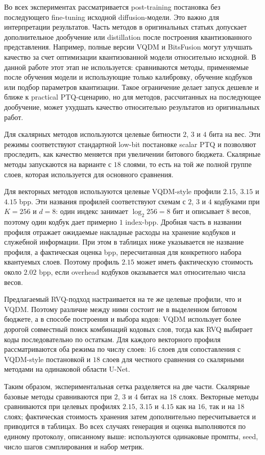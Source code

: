 \documentclass[a4paper,12pt]{article}
\begin{document}
Во всех экспериментах рассматривается post-training постановка без последующего fine-tuning исходной diffusion-модели. Это важно для интерпретации результатов. Часть методов в оригинальных статьях допускает дополнительное дообучение или distillation после построения квантизованного представления. Например, полные версии VQDM и BitsFusion могут улучшать качество за счет оптимизации квантизованной модели относительно исходной. В данной работе этот этап не используется: сравниваются методы, применяемые после обучения модели и использующие только калибровку, обучение кодбуков или подбор параметров квантизации. Такое ограничение делает запуск дешевле и ближе к practical PTQ-сценарию, но для методов, рассчитанных на последующее дообучение, может ухудшать качество относительно результатов из оригинальных работ.

Для скалярных методов используются целевые битности $2$, $3$ и $4$ бита на вес. Эти режимы соответствуют стандартной low-bit постановке scalar PTQ и позволяют проследить, как качество меняется при увеличении битового бюджета. Скалярные методы запускаются на варианте с $18$ слоями, то есть на той же полной группе слоев, которая используется для основного сравнения.

Для векторных методов используются целевые VQDM-style профили $2.15$, $3.15$ и $4.15$ bpp. Эти названия профилей соответствуют схемам с $2$, $3$ и $4$ кодбуками при $K=256$ и $d=8$: один индекс занимает $\log_2 256 = 8$ бит и описывает $8$ весов, поэтому один кодбук дает примерно $1$ index-bpp. Дробная часть в названии профиля отражает ожидаемые накладные расходы на хранение кодбуков и служебной информации. При этом в таблицах ниже указывается не название профиля, а фактическая оценка bpp, пересчитанная для конкретного набора квантуемых слоев. Поэтому профиль $2.15$ может иметь фактическую стоимость около $2.02$ bpp, если overhead кодбуков оказывается мал относительно числа весов.

Предлагаемый RVQ-подход настраивается на те же целевые профили, что и VQDM. Поэтому различие между ними состоит не в выделенном битовом бюджете, а в способе построения и выбора кодов: VQDM использует более дорогой совместный поиск комбинаций кодовых слов, тогда как RVQ выбирает коды последовательно по остаткам. Для каждого векторного профиля рассматриваются оба режима по числу слоев: $16$ слоев для сопоставления с VQDM-style постановкой и $18$ слоев для честного сравнения со скалярными методами на одинаковой области U-Net.

Таким образом, экспериментальная сетка разделяется на две части. Скалярные базовые методы сравниваются при $2$, $3$ и $4$ битах на $18$ слоях. Векторные методы сравниваются при целевых профилях $2.15$, $3.15$ и $4.15$ как на $16$, так и на $18$ слоях; фактическая стоимость хранения затем дополнительно пересчитывается и приводится в таблицах. Во всех случаях генерация и оценка выполняются по единому протоколу, описанному выше: используются одинаковые промпты, seed, число шагов сэмплирования и набор метрик.
\end{document}
